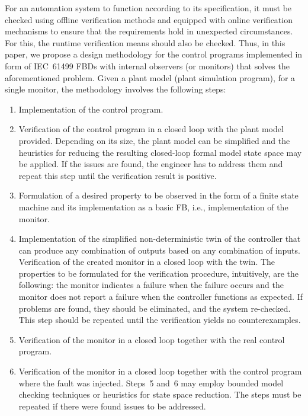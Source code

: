 \begin{bibunit}
For an automation system to function according to its specification, it must be checked using offline verification methods and equipped with online verification mechanisms to ensure that the requirements hold in unexpected circumstances. For this, the runtime verification means should also be checked.
Thus, in this paper, we propose a design methodology for the control programs implemented in form of IEC~61499 FBDs with internal observers (or monitors) that solves the aforementioned problem. Given a plant model (plant simulation program), for a single monitor, the methodology involves the following steps:
\begin{enumerate}
    \item Implementation of the control program.
    \item Verification of the control program in a closed loop with the plant model provided. Depending on its size, the plant model can be simplified and the heuristics for reducing the resulting closed-loop formal model state space may be applied. If the issues are found, the engineer has to address them and repeat this step until the verification result is positive.
    \item Formulation of a desired property to be observed in the form of a finite state machine and its implementation as a basic FB, i.e., implementation of the monitor.
    \item Implementation of the simplified non-deterministic twin of the controller that can produce any combination of outputs based on any combination of inputs. Verification of the created monitor in a closed loop with the twin. The properties to be formulated for the verification procedure, intuitively, are the following: the monitor indicates a failure when the failure occurs and the monitor does not report a failure when the controller functions as expected. If problems are found, they should be eliminated, and the system re-checked. This step should be repeated until the verification yields no counterexamples.
    \item Verification of the monitor in a closed loop together with the real control program.
    \item Verification of the monitor in a closed loop together with the control program where the fault was injected. Steps~5 and~6 may employ bounded model checking techniques or heuristics for state space reduction. The steps must be repeated if there were found issues to be addressed.
\end{enumerate}


\end{bibunit}
